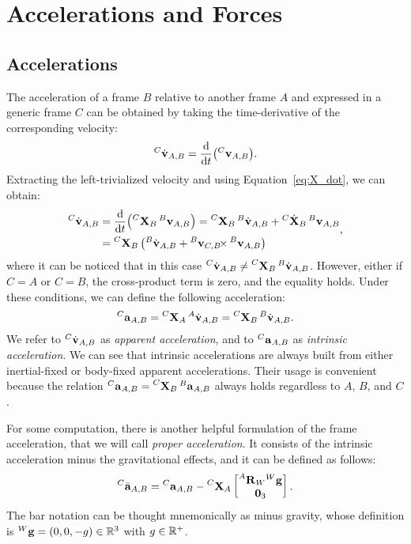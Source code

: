 \section{Accelerations and Forces}

\subsection{Accelerations}

The acceleration of a frame $B$ relative to another frame $A$ and expressed in a generic frame $C$ can be obtained by taking the time-derivative of the corresponding velocity:
%
\begin{equation*}
    \velsixd[C]_{A,B} = \dv{t}(\velsix[C]_{A,B})
    .
\end{equation*}
%
Extracting the left-trivialized velocity and using Equation~\eqref{eq:X_dot}, we can obtain:
%
\begin{equation}
    \label{eq:sixd_apparent_acceleration}
    \begin{aligned}
        \velsixd[C]_{A,B}
        &= \dv{t}(\transvel[C]_B \velsix[B]_{A,B})
        = \transvel[C]_B \velsixd[B]_{A,B} + {}^C \dot{\mathbf{X}}_B \velsix[B]_{A,B} \\
        &= \transvel[C]_B \left( \velsixd[B]_{A,B} + \crossvelsix[{\velsix[B]_{C,B}}] \velsix[B]_{A,B} \right)
    \end{aligned}
    ,
\end{equation}
%
where it can be noticed that in this case $\velsixd[C]_{A,B} \neq \transvel[C]_B \velsixd[B]_{A,B}$.
However, either if $C=A$ or $C=B$, the cross-product term is zero, and the equality holds.
Under these conditions, we can define the following acceleration:
%
\begin{equation*}
    \label{eq:sixd_intrinsic_acceleration}
    \accsix[C]_{A,B} = \transvel[C]_A \velsixd[A]_{A,B} = \transvel[C]_B \velsixd[B]_{A,B}
    .
\end{equation*}
%
We refer to $\velsixd[C]_{A,B}$ as \emph{apparent acceleration}, and to $\accsix[C]_{A,B}$ as \emph{intrinsic acceleration}.
We can see that intrinsic accelerations are always built from either inertial-fixed or body-fixed apparent accelerations.
Their usage is convenient because the relation $\accsix[C]_{A,B} = \transvel[C]_B \accsix[B]_{A,B}$ always holds regardless to $A$, $B$, and $C$.

For some computation, there is another helpful formulation of the frame acceleration, that we will call \emph{proper acceleration}.
It consists of the intrinsic acceleration minus the gravitational effects, and it can be defined as follows:
%
\begin{equation}
    \label{eq:sixd_proper_acceleration}
    {}^C \bar{\mathbf{a}}_{A,B} = \accsix[C]_{A,B} - \transvel[C]_A
    \begin{bmatrix}
        \rot[A]_W {}^W \mathbf{g} \\ \zeros_3
    \end{bmatrix}
    .
\end{equation}
%
The bar notation can be thought mnemonically as minus gravity, whose definition is ${}^W \mathbf{g} = (0, 0, -g) \in \realn^3$ with $g \in \realn^+$.

